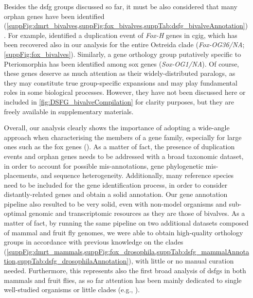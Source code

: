 Besides the \gls{dsfg} groups discussed so far, it must be also considered that many orphan genes have been identified (\cref{suppFig:dmrt_bivalves,suppFig:fox_bivalves,suppTab:dsfg_bivalveAnnotation}). For example,  identified a duplication event of \textit{Fox-H} genes in \gls{cgig}, which has been recovered also in our analysis for the entire Ostreida clade (\textit{Fox-OG36/NA}; \cref{suppFig:fox_bivalves}). Similarly, a gene orthology group putatively specific to Pteriomorphia has been identified among \gls{sox} genes (\textit{Sox-OG1/NA}). Of course, these genes deserve as much attention as their widely-distributed paralogs, as they may constitute true group-specific expansions and may play fundamental roles in some biological processes. However, they have not been discussed here or included in \cref{fig:DSFG_bivalveCompilation} for clarity purposes, but they are freely available in supplementary materials.

Overall, our analysis clearly shows the importance of adopting a wide-angle approach when characterising the members of a gene family, especially for large ones such as the \gls{fox} genes (). As a matter of fact, the presence of duplication events and orphan genes needs to be addressed with a broad taxonomic dataset, in order to account for possible mis-annotations, gene phylogenetic mis-placements, and sequence heterogeneity. Additionally, many reference species need to be included for the gene identification process, in order to consider distantly-related genes and obtain a solid annotation. Our gene annotation pipeline also resulted to be very solid, even with non-model organisms and sub-optimal genomic and transcriptomic resources as they are those of bivalves. As a matter of fact, by running the same pipeline on two additional datasets composed of mammal and fruit fly genomes, we were able to obtain high-quality orthology groups in accordance with previous knowledge on the clades (\cref{suppFig:dmrt_mammals,suppFig:fox_drosophila,suppTab:dsfg_mammalAnnotation,suppTab:dsfg_drosophilaAnnotation}), with little or no manual curation needed. Furthermore, this represents also the first broad analysis of \glspl{dsfg} in both mammals and fruit flies, as so far attention has been mainly dedicated to single well-studied organisms or little clades (e.g., ).

